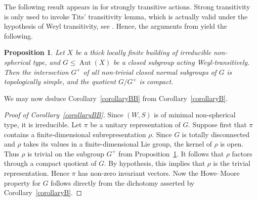 \documentclass[12pt,a4paper]{amsproc}
\newtheorem{proposition}[theorem]{Proposition}
\theoremstyle{definition}
\DeclareMathOperator{\Aut}{Aut}
\begin{document}
The following result appears in  \cite[Corollary~3.1]{CapMon} for strongly transitive actions. Strong transitivity is only used to invoke Tits' transitivity lemma, which is actually valid under the hypothesis of Weyl transitivity, see \cite[\S6.2.7]{AbramenkoBrown}. Hence, the arguments from \cite[Corollary~3.1]{CapMon} yield the following. 

\begin{proposition}\label{prop:simple-by-compact}
Let $X$ be a thick locally finite building of irreducible non-spherical type, and $G \leq \Aut(X)$ be a closed subgroup acting Weyl-transitively. Then the intersection $G^+$ of all non-trivial closed normal subgroups of $G$ is topologically simple, and the quotient $G/G^+$ is compact. 
\end{proposition}
	

We may now deduce Corollary~\ref{corollaryBB} from Corollary~\ref{corollaryB}. 

\begin{proof}[Proof of Corollary~\ref{corollaryBB}]
Since $(W, S)$ is of minimal non-spherical type, it is irreducible. 
Let  $\pi $ be a unitary representation of $G$. Suppose first that $\pi$ contains a finite-dimensional subrepresentation $\rho$. Since $G$ is totally disconnected and $\rho$ takes its values in a finite-dimensional Lie group, the kernel of $\rho$ is open. Thus $\rho$ is trivial on the subgroup $G^+$ from Proposition~\ref{prop:simple-by-compact}. It follows that $\rho$ factors through a compact quotient of $G$. By hypothesis, this implies that $\rho$ is the trivial representation. Hence $\pi$ has non-zero  invariant vectors. Now the Howe--Moore property for $G$ follows directly from the dichotomy asserted by Corollary~\ref{corollaryB}. 
\end{proof}
\end{document}
